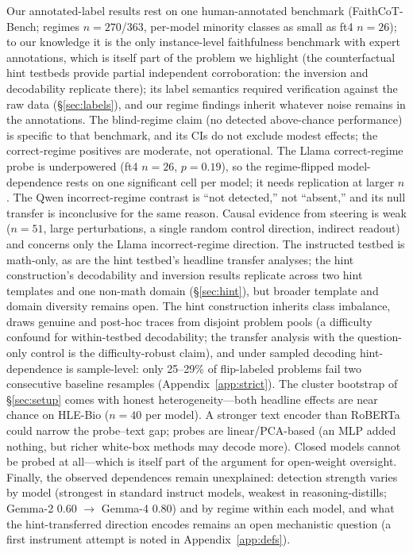 \documentclass[11pt]{article}
\begin{document}
Our annotated-label results rest on one human-annotated benchmark (FaithCoT-Bench; regimes $n{=}270$/$363$, per-model minority classes as small as ft4 $n{=}26$); to our knowledge it is the only instance-level faithfulness benchmark with expert annotations, which is itself part of the problem we highlight (the counterfactual hint testbeds provide partial independent corroboration: the inversion and decodability replicate there); its label semantics required verification against the raw data (\S\ref{sec:labels}), and our regime findings inherit whatever noise remains in the annotations. The blind-regime claim (no detected above-chance performance) is specific to that benchmark, and its CIs do not exclude modest effects; the correct-regime positives are moderate, not operational. The Llama correct-regime probe is underpowered (ft4 $n{=}26$, $p{=}0.19$), so the regime-flipped model-dependence rests on one significant cell per model; it needs replication at larger $n$. The Qwen incorrect-regime contrast is ``not detected,'' not ``absent,'' and its null transfer is inconclusive for the same reason. Causal evidence from steering is weak ($n{=}51$, large perturbations, a single random control direction, indirect readout) and concerns only the Llama incorrect-regime direction. The instructed testbed is math-only, as are the hint testbed's headline transfer analyses; the hint construction's decodability and inversion results replicate across two hint templates and one non-math domain (\S\ref{sec:hint}), but broader template and domain diversity remains open. The hint construction inherits class imbalance, draws genuine and post-hoc traces from disjoint problem pools (a difficulty confound for within-testbed decodability; the transfer analysis with the question-only control is the difficulty-robust claim), and under sampled decoding hint-dependence is sample-level: only 25--29\% of flip-labeled problems fail two consecutive baseline resamples (Appendix~\ref{app:strict}). The cluster bootstrap of \S\ref{sec:setup} comes with honest heterogeneity---both headline effects are near chance on HLE-Bio ($n{=}40$ per model). A stronger text encoder than RoBERTa could narrow the probe--text gap; probes are linear/PCA-based (an MLP added nothing, but richer white-box methods may decode more). Closed models cannot be probed at all---which is itself part of the argument for open-weight oversight. Finally, the observed dependences remain unexplained: detection strength varies by model (strongest in standard instruct models, weakest in reasoning-distills; Gemma-2 0.60 $\to$ Gemma-4 0.80) and by regime within each model, and what the hint-transferred direction encodes remains an open mechanistic question (a first instrument attempt is noted in Appendix~\ref{app:defs}).
\end{document}

